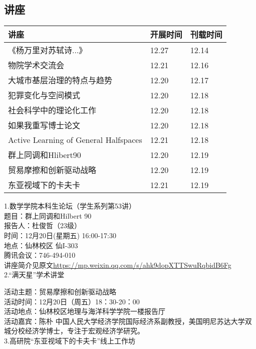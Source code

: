 \documentclass[letterpaper, 12pt]{article}
\begin{document}
\begin{multicols}{2}

\section{讲座}
\begin{tabular}{|>{\centering\arraybackslash}m{}|m{}|m{}|}
    \hline
    讲座 & 开展时间 & 刊载时间\\
    \hline\hline
《杨万里对苏轼诗...》 & 12.27 & 12.14\\\hline
物院学术交流会 & 12.21 & 12.16\\\hline
大城市基层治理的特点与趋势 & 12.20 & 12.17\\\hline
犯罪变化与空间模式 & 12.20 & 12.18\\\hline
社会科学中的理论化工作 & 12.20 & 12.18\\\hline
如果我重写博士论文 & 12.20 & 12.18\\\hline
Active Learning of General Halfspaces & 12.21 & 12.18\\\hline
群上同调和Hlibert90 & 12.20 & 12.19\\\hline
贸易摩擦和创新驱动战略 & 12.20 & 12.19\\\hline
东亚视域下的卡夫卡 & 12.21 & 12.19\\\hline
\end{tabular}

1.数学学院本科生论坛（学生系列第53讲）\\
题目：群上同调和Hilbert 90\\
报告人：杜俊哲（23级）\\
时间：12月20日(星期五) 16:00-17:30\\
地点：仙林校区 仙I-303\\
腾讯会议：746-494-010\\
讲座简介见原文\url{https://mp.weixin.qq.com/s/ahk9dopXTTSwuRqbidB6Fg}\\

2.“满天星”学术讲堂

活动主题：贸易摩擦和创新驱动战略\\
活动时间：12月20日（周五）18：30-20：00\\
活动地点：仙林校区地理与海洋科学学院一楼报告厅\\
活动嘉宾：陈朴 中国人民大学经济学院国际经济系副教授，美国明尼苏达大学双城分校经济学博士，专注于宏观经济学研究。\\

3.高研院“东亚视域下的卡夫卡”线上工作坊


\end{multicols}
\end{document}
